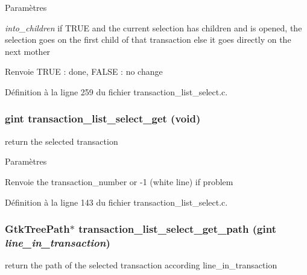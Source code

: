 \begin{DoxyParams}{Paramètres}
\item[{\em into\_\-children}]if TRUE and the current selection has children and is opened, the selection goes on the first child of that transaction else it goes directly on the next mother\end{DoxyParams}
\begin{DoxyReturn}{Renvoie}
TRUE : done, FALSE : no change 
\end{DoxyReturn}


Définition à la ligne 259 du fichier transaction\_\-list\_\-select.c.

\subsubsection[{transaction\_\-list\_\-select\_\-get}]{\setlength{\rightskip}{0pt plus 5cm}gint transaction\_\-list\_\-select\_\-get (void)}\label{transaction__list__select_8c_a0a2effd6ee01ec6f9b848593b797398a}
return the selected transaction


\begin{DoxyParams}{Paramètres}
\item[{\em }]\end{DoxyParams}
\begin{DoxyReturn}{Renvoie}
the transaction\_\-number or -\/1 (white line) if problem 
\end{DoxyReturn}


Définition à la ligne 143 du fichier transaction\_\-list\_\-select.c.

\subsubsection[{transaction\_\-list\_\-select\_\-get\_\-path}]{\setlength{\rightskip}{0pt plus 5cm}GtkTreePath$\ast$ transaction\_\-list\_\-select\_\-get\_\-path (gint {\em line\_\-in\_\-transaction})}\label{transaction__list__select_8c_ac4dba240fa9e06af594157c07e62c2d8}
return the path of the selected transaction according line\_\-in\_\-transaction


